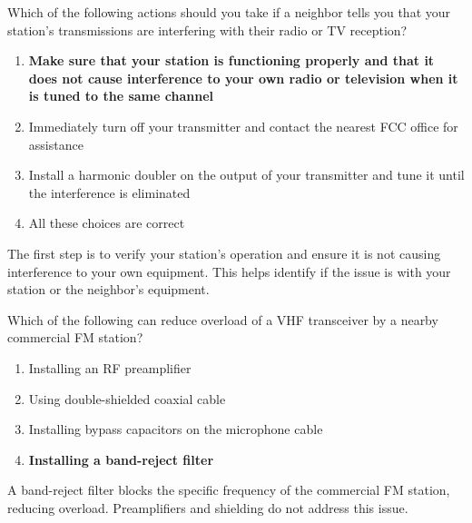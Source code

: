 \begin{tcolorbox}[colback=gray!10!white,colframe=black!75!black,title={T7B06}]
    Which of the following actions should you take if a neighbor tells you that your station’s transmissions are interfering with their radio or TV reception?
    \begin{enumerate}[label=\Alph*),noitemsep]
        \item \textbf{Make sure that your station is functioning properly and that it does not cause interference to your own radio or television when it is tuned to the same channel}
        \item Immediately turn off your transmitter and contact the nearest FCC office for assistance
        \item Install a harmonic doubler on the output of your transmitter and tune it until the interference is eliminated
        \item All these choices are correct
    \end{enumerate}
\end{tcolorbox}
The first step is to verify your station's operation and ensure it is not causing interference to your own equipment. This helps identify if the issue is with your station or the neighbor's equipment.


\begin{tcolorbox}[colback=gray!10!white,colframe=black!75!black,title={T7B07}]
    Which of the following can reduce overload of a VHF transceiver by a nearby commercial FM station?
    \begin{enumerate}[label=\Alph*),noitemsep]
        \item Installing an RF preamplifier
        \item Using double-shielded coaxial cable
        \item Installing bypass capacitors on the microphone cable
        \item \textbf{Installing a band-reject filter}
    \end{enumerate}
\end{tcolorbox}
A band-reject filter blocks the specific frequency of the commercial FM station, reducing overload. Preamplifiers and shielding do not address this issue.


